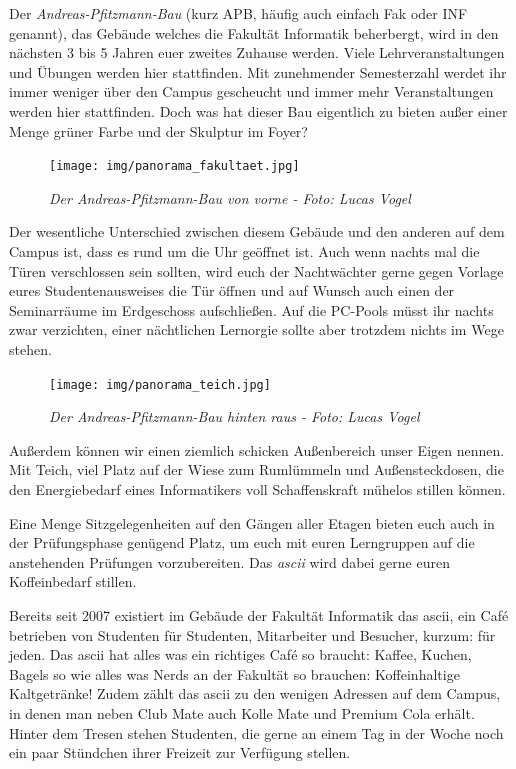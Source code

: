 
Der \emph{Andreas-Pfitzmann-Bau} (kurz APB, häufig auch einfach \glqq{}Fak\grqq{} oder INF genannt), das Gebäude welches die Fakultät Informatik beherbergt, wird in den nächsten 3 bis 5 Jahren euer zweites Zuhause werden.
Viele Lehrveranstaltungen und Übungen werden hier stattfinden. Mit zunehmender Semesterzahl werdet ihr immer weniger über den Campus gescheucht und immer mehr Veranstaltungen werden hier stattfinden.
Doch was hat dieser Bau eigentlich zu bieten außer einer Menge grüner Farbe und der Skulptur im Foyer?

\begin{figure}[h!]
\centering
\texttt{[image: img/panorama\_fakultaet.jpg]}
\caption*{\small \textit{Der Andreas-Pfitzmann-Bau von vorne - Foto: Lucas Vogel}}
\end{figure}

Der wesentliche Unterschied zwischen diesem Gebäude und den anderen auf dem Campus ist, dass es rund um die Uhr geöffnet ist. Auch wenn nachts mal die Türen verschlossen sein sollten, wird euch der Nachtwächter gerne gegen Vorlage eures Studentenausweises die Tür öffnen und auf Wunsch auch einen der Seminarräume im Erdgeschoss aufschließen. 
Auf die PC-Pools müsst ihr nachts zwar verzichten, einer nächtlichen Lernorgie sollte aber trotzdem nichts im Wege stehen.

\begin{figure}[h!]
\centering
\texttt{[image: img/panorama\_teich.jpg]}
\caption*{\small \textit{Der Andreas-Pfitzmann-Bau hinten raus - Foto: Lucas Vogel}}
\end{figure}

Außerdem können wir einen ziemlich schicken Außenbereich unser Eigen nennen. Mit Teich, viel Platz auf der Wiese zum Rumlümmeln und Außensteckdosen, die den Energiebedarf eines Informatikers voll Schaffenskraft mühelos stillen können.

Eine Menge Sitzgelegenheiten auf den Gängen aller Etagen bieten euch auch in der Prüfungsphase genügend Platz, um euch mit euren Lerngruppen auf die anstehenden Prüfungen vorzubereiten. Das \emph{ascii} wird dabei gerne euren Koffeinbedarf stillen.


Bereits seit 2007 existiert im Gebäude der Fakultät Informatik das ascii, ein Café betrieben von Studenten für Studenten, Mitarbeiter und Besucher, kurzum: für jeden.
Das ascii hat alles was ein richtiges Café so braucht: Kaffee, Kuchen, Bagels so wie alles was Nerds an der Fakultät so brauchen: Koffeinhaltige Kaltgetränke!
Zudem zählt das ascii zu den wenigen Adressen auf dem Campus, in denen man neben Club Mate auch Kolle Mate und Premium Cola erhält.
Hinter dem Tresen stehen Studenten, die gerne an einem Tag in der Woche noch ein paar Stündchen ihrer Freizeit zur Verfügung stellen.


